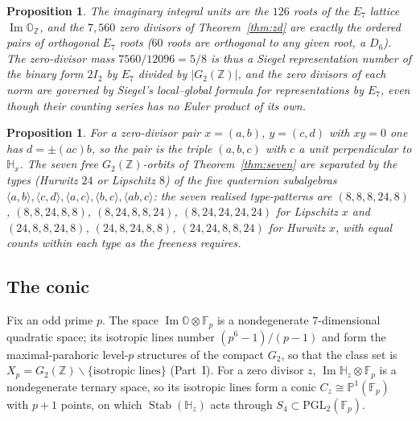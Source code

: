 \documentclass[11pt]{amsart}
\newtheorem{proposition}[theorem]{Proposition}
\theoremstyle{definition}
\renewcommand{\O}{\mathbb{O}}\newcommand{\Sd}{\mathbb{S}}\newcommand{\Hq}{\mathbb{H}}\newcommand{\Z}{\mathbb{Z}}\newcommand{\Q}{\mathbb{Q}}\newcommand{\R}{\mathbb{R}}\newcommand{\C}{\mathbb{C}}\newcommand{\F}{\mathbb{F}}
\newcommand{\Stab}{\operatorname{Stab}}\newcommand{\Aut}{\operatorname{Aut}}\newcommand{\Der}{\operatorname{Der}}\renewcommand{\Im}{\operatorname{Im}}
\begin{document}
\begin{proposition}\label{prop:e7}
The imaginary integral units are the $126$ roots of the $E_7$ lattice $\Im\O_\Z$, and the $7{,}560$ zero divisors of Theorem~\ref{thm:zd} are exactly the ordered pairs of orthogonal $E_7$ roots ($60$ roots are orthogonal to any given root, a $D_6$). The zero-divisor mass $7560/12096=5/8$ is thus a Siegel representation number of the binary form $2I_2$ by $E_7$ divided by $|G_2(\Z)|$, and the zero divisors of each norm are governed by Siegel's local--global formula for representations by $E_7$, even though their counting series has no Euler product of its own.
\end{proposition}
\begin{proposition}\label{prop:seven}
For a zero-divisor pair $x=(a,b)$, $y=(c,d)$ with $xy=0$ one has $d=\pm(ac)b$, so the pair is the triple $(a,b,c)$ with $c$ a unit perpendicular to $\Hq_x$. The seven free $G_2(\Z)$-orbits of Theorem~\ref{thm:seven} are separated by the types (Hurwitz $24$ or Lipschitz $8$) of the five quaternion subalgebras $\langle a,b\rangle,\langle c,d\rangle,\langle a,c\rangle,\langle b,c\rangle,\langle ab,c\rangle$: the seven realised type-patterns are $(8,8,8,24,8)$, $(8,8,24,8,8)$, $(8,24,8,8,24)$, $(8,24,24,24,24)$ for Lipschitz $x$ and $(24,8,8,24,8)$, $(24,8,24,8,8)$, $(24,24,8,8,24)$ for Hurwitz $x$, with equal counts within each type as the freeness requires.
\end{proposition}

\subsection{The conic}
Fix an odd prime $p$. The space $\Im\O\otimes\F_p$ is a nondegenerate $7$-dimensional quadratic space; its isotropic lines number $(p^6-1)/(p-1)$ and form the maximal-parahoric level-$p$ structures of the compact $G_2$, so that the class set is $X_p=G_2(\Z)\backslash\{\text{isotropic lines}\}$ (Part~I). For a zero divisor $z$, $\Im\Hq_z\otimes\F_p$ is a nondegenerate ternary space, so its isotropic lines form a conic $C_z\cong\mathbb P^1(\F_p)$ with $p+1$ points, on which $\Stab(\Hq_z)$ acts through $S_4\subset\mathrm{PGL}_2(\F_p)$.
\end{document}
